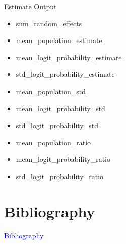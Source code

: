 \documentclass{beamer}
\newcommand{\Blue}[1]{\textcolor{blue}{#1}}
\newcommand{\Section}[1]{
	\section{#1}
	\begin{frame}
	\begin{center}
	\Blue{ \Large{#1} }
	\end{center}
	\end{frame}
}
\begin{document}
\begin{frame}{Estimate Output}
\begin{itemize}

\item
sum\_random\_effects
\pause

\item
mean\_population\_estimate
\pause

\item
mean\_logit\_probability\_estimate
\pause

\item
std\_logit\_probability\_estimate
\pause

\item
mean\_population\_std
\pause

\item
mean\_logit\_probability\_std
\pause

\item
std\_logit\_probability\_std
\pause

\item
mean\_population\_ratio
\pause

\item
mean\_logit\_probability\_ratio
\pause

\item
std\_logit\_probability\_ratio
\pause


\end{itemize}
\end{frame}

\Section{Bibliography}
%
{}

\end{document}
